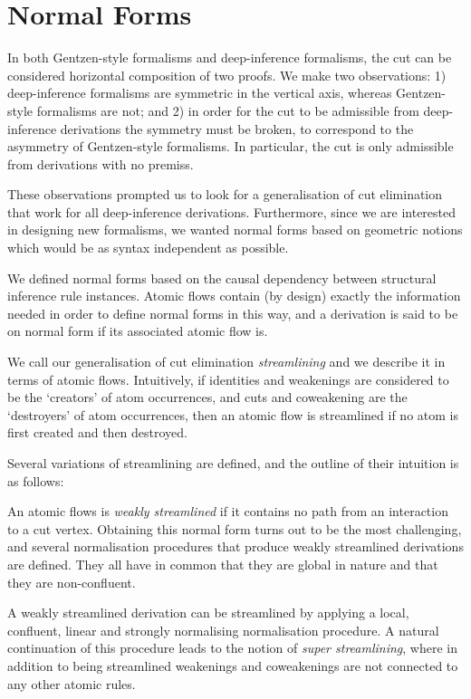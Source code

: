 \section{Normal Forms}

In both Gentzen-style formalisms and deep-inference formalisms, the cut can be considered horizontal composition of two proofs. We make two observations: 1) deep-inference formalisms are symmetric in the vertical axis, whereas Gentzen-style formalisms are not; and 2) in order for the cut to be admissible from deep-inference derivations the symmetry must be broken, to correspond to the asymmetry of Gentzen-style formalisms. In particular, the cut is only admissible from derivations with no premiss.

These observations prompted us to look for a generalisation of cut elimination that work for all deep-inference derivations. Furthermore, since we are interested in designing new formalisms, we wanted normal forms based on geometric notions which would be as syntax independent as possible.

We defined normal forms based on the causal dependency between structural inference rule instances. Atomic flows contain (by design) exactly the information needed in order to define normal forms in this way, and a derivation is said to be on normal form if its associated atomic flow is.

We call our generalisation of cut elimination \emph{streamlining} and we describe it in terms of atomic flows. Intuitively, if identities and weakenings are considered to be the `creators' of atom occurrences, and cuts and coweakening are the `destroyers' of atom occurrences, then an atomic flow is streamlined if no atom is first created and then destroyed.

Several variations of streamlining are defined, and the outline of their intuition is as follows:

An atomic flows is \emph{weakly streamlined} if it contains no path from an interaction to a cut vertex. Obtaining this normal form turns out to be the most challenging, and several normalisation procedures that produce weakly streamlined derivations are defined. They all have in common that they are global in nature and that they are non-confluent.

A weakly streamlined derivation can be streamlined by applying a local, confluent, linear and strongly normalising normalisation procedure. A natural continuation of this procedure leads to the notion of \emph{super streamlining}, where in addition to being streamlined weakenings and coweakenings are not connected to any other atomic rules.

